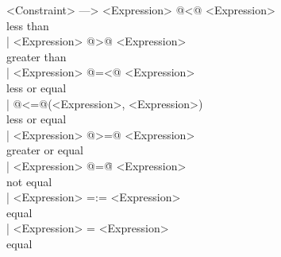 <Constraint> ---> <Expression> @{<@} <Expression>		\\ less than \\
	     | <Expression> @{>@} <Expression>		\\ greater than \\
	     | <Expression> @{=<@} <Expression>	\\ less or equal \\
	     | @{<=@}(<Expression>, <Expression>)	\\ less or equal \\
	     | <Expression> @{>=@} <Expression>	\\ greater or equal \\
	     | <Expression> @{=\=@} <Expression>	\\ not equal \\
	     | <Expression> =:= <Expression>		\\ equal \\
	     | <Expression> = <Expression>		\\ equal \\

